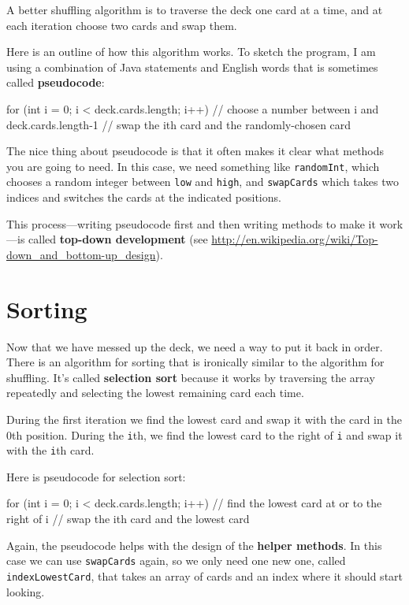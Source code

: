 A better shuffling algorithm is to traverse the deck one card at a
time, and at each iteration choose two cards and swap them.

Here is an outline of how this algorithm works.  To sketch the
program, I am using a combination of Java statements and English
words that is sometimes called {\bf pseudocode}:  

\begin{code}
    for (int i = 0; i < deck.cards.length; i++) {
        // choose a number between i and deck.cards.length-1
        // swap the ith card and the randomly-chosen card
    }
\end{code}
%
The nice thing about pseudocode is that it often makes it
clear what methods you are going to need.  In this case, we
need something like {\tt randomInt}, which chooses a random
integer between {\tt low} and {\tt high},
and {\tt swapCards} which takes two indices and switches the
cards at the indicated positions.

This process---writing pseudocode first and then writing
methods to make it work---is called {\bf top-down development}
(see \url{http://en.wikipedia.org/wiki/Top-down_and_bottom-up_design}).


\section{Sorting}
\label{sorting}

Now that we have messed up the deck, we need a way to put it back in
order.  There is an algorithm for sorting that is ironically similar
to the algorithm for shuffling.  It's called {\bf selection sort}
because it works by traversing the array repeatedly and selecting the
lowest remaining card each time.

During the first iteration we find the lowest card and swap
it with the card in the 0th position.  During the {\tt i}th, we find the
lowest card to the right of {\tt i} and swap it with the {\tt i}th
card.

Here is pseudocode for selection sort:

\begin{code}
    for (int i = 0; i < deck.cards.length; i++) {
        // find the lowest card at or to the right of i
        // swap the ith card and the lowest card
    }
\end{code}
%
Again, the pseudocode helps with the design of the {\bf helper
methods}.  In this case we can use {\tt swapCards} again,
so we only need one new one, called {\tt indexLowestCard},
that takes an array of cards and an index where it should
start looking.



